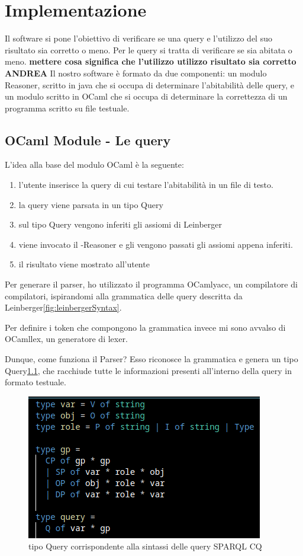 \chapter[Implementazione]{Implementazione}
\label{chap:Implementazione}
Il software si pone l'obiettivo di verificare se una query e l'utilizzo del suo risultato sia corretto o meno. Per le query si tratta di verificare se sia abitata o meno. \textbf{mettere cosa significa che l'utilizzo utilizzo risultato sia corretto ANDREA} Il nostro software è formato da due componenti: un modulo Reasoner, scritto in java che si occupa di determinare l'abitabilità delle query, e un modulo scritto in OCaml che si occupa di determinare la correttezza di un programma scritto su file testuale.


\section{OCaml Module - Le query}
L'idea alla base del modulo OCaml è la seguente:
\begin{enumerate}
    \item l'utente inserisce la query di cui testare l'abitabilità in un file di testo.
    \item la query viene parsata in un tipo Query
    \item sul tipo Query vengono inferiti gli assiomi di Leinberger
    \item viene invocato il -Reasoner e gli vengono passati gli assiomi appena inferiti.
    \item il risultato viene mostrato all'utente
\end{enumerate}

Per generare il parser, ho utilizzato il programma OCamlyacc, un compilatore di compilatori, ispirandomi alla grammatica delle query descritta da Leinberger\ref{fig:leinbergerSyntax}. 

Per definire i token che compongono la grammatica invece mi sono avvalso di OCamllex, un generatore di lexer.


Dunque, come funziona il Parser? Esso riconosce la grammatica e genera un tipo Query\ref{fig:querType}, che racchiude tutte le informazioni presenti all'interno della query in formato testuale. 

\begin{figure}[H]
    \centering
    \includegraphics[scale=0.7]{pictures/queryType.png}
    \caption{tipo Query corrispondente alla sintassi delle query SPARQL CQ}
    \label{fig:querType}
\end{figure}


